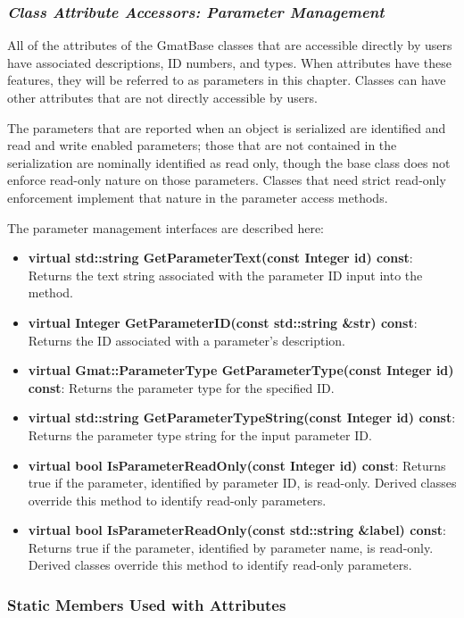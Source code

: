 \subsubsection{\textit{Class Attribute Accessors: Parameter Management}}

All of the attributes of the GmatBase classes that are accessible directly by users have associated
descriptions, ID numbers, and types.  When attributes have these features, they will be referred to
as parameters in this chapter.  Classes can have other attributes that are not directly accessible
by users.

The parameters that are reported when an object is serialized are identified and read and
write enabled parameters; those that are not contained in the serialization are nominally identified
as read only, though the base class does not enforce read-only nature on those parameters.  Classes
that need strict read-only enforcement implement that nature in the parameter access methods.

The parameter management interfaces are described here:

\begin{itemize}
\item \textbf{virtual std::string GetParameterText(const Integer id) const}: Returns the text
string associated with the parameter ID input into the method.
\item \textbf{virtual Integer GetParameterID(const std::string \&str) const}: Returns the ID
associated with a parameter's description.
\item \textbf{virtual Gmat::ParameterType GetParameterType(const Integer id) const}: Returns
the parameter type for the specified ID.
\item \textbf{virtual std::string GetParameterTypeString(const Integer id) const}: Returns the
parameter type string for the input parameter ID.
\item \textbf{virtual bool IsParameterReadOnly(const Integer id) const}: Returns true if the
parameter, identified by parameter ID, is read-only.  Derived classes override this method to
identify read-only parameters.
\item \textbf{virtual bool IsParameterReadOnly(const std::string \&label) const}: Returns true if
the parameter, identified by parameter name, is read-only.  Derived classes override this method to
identify read-only parameters.
\end{itemize}

\subsubsection{Static Members Used with Attributes}

